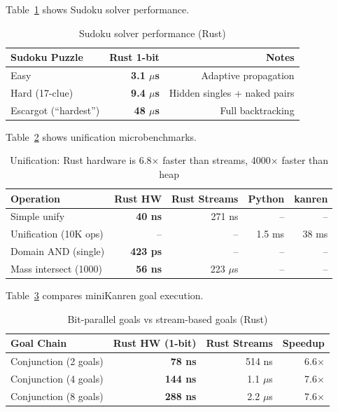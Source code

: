 \documentclass[11pt,a4paper]{article}
\begin{document}
Table~\ref{tab:sudoku} shows Sudoku solver performance.

\begin{table}[H]
\centering
\begin{tabular}{lrr}
\toprule
\textbf{Sudoku Puzzle} & \textbf{Rust 1-bit} & \textbf{Notes} \\
\midrule
Easy & \textbf{3.1 $\mu$s} & Adaptive propagation \\
Hard (17-clue) & \textbf{9.4 $\mu$s} & Hidden singles + naked pairs \\
Escargot (``hardest'') & \textbf{48 $\mu$s} & Full backtracking \\
\bottomrule
\end{tabular}
\caption{Sudoku solver performance (Rust)}
\label{tab:sudoku}
\end{table}

Table~\ref{tab:unify} shows unification microbenchmarks.

\begin{table}[H]
\centering
\begin{tabular}{lrrrr}
\toprule
\textbf{Operation} & \textbf{Rust HW} & \textbf{Rust Streams} & \textbf{Python} & \textbf{kanren} \\
\midrule
Simple unify & \textbf{40 ns} & 271 ns & -- & -- \\
Unification (10K ops) & -- & -- & 1.5 ms & 38 ms \\
Domain AND (single) & \textbf{423 ps} & -- & -- & -- \\
Mass intersect (1000) & \textbf{56 ns} & 223 $\mu$s & -- & -- \\
\bottomrule
\end{tabular}
\caption{Unification: Rust hardware is 6.8$\times$ faster than streams, 4000$\times$ faster than heap}
\label{tab:unify}
\end{table}

Table~\ref{tab:goals} compares miniKanren goal execution.

\begin{table}[H]
\centering
\begin{tabular}{lrrr}
\toprule
\textbf{Goal Chain} & \textbf{Rust HW (1-bit)} & \textbf{Rust Streams} & \textbf{Speedup} \\
\midrule
Conjunction (2 goals) & \textbf{78 ns} & 514 ns & 6.6$\times$ \\
Conjunction (4 goals) & \textbf{144 ns} & 1.1 $\mu$s & 7.6$\times$ \\
Conjunction (8 goals) & \textbf{288 ns} & 2.2 $\mu$s & 7.6$\times$ \\
\bottomrule
\end{tabular}
\caption{Bit-parallel goals vs stream-based goals (Rust)}
\label{tab:goals}
\end{table}
\end{document}
